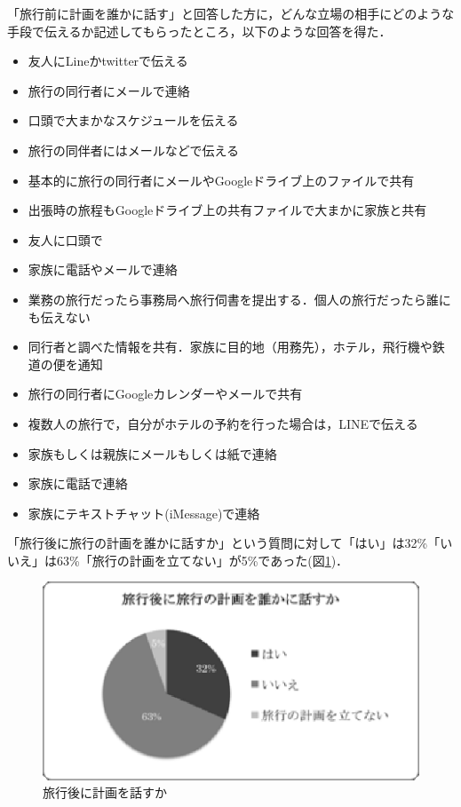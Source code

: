 \documentclass{funthesis}
\begin{document}
「旅行前に計画を誰かに話す」と回答した方に，どんな立場の相手にどのような手段で伝えるか記述してもらったところ，以下のような回答を得た．
\begin{itemize}
 \item 友人にLineかtwitterで伝える
 \item 旅行の同行者にメールで連絡
 \item 口頭で大まかなスケジュールを伝える
 \item 旅行の同伴者にはメールなどで伝える
 \item 基本的に旅行の同行者にメールやGoogleドライブ上のファイルで共有
 \item 出張時の旅程もGoogleドライブ上の共有ファイルで大まかに家族と共有
 \item 友人に口頭で
 \item 家族に電話やメールで連絡
 \item 業務の旅行だったら事務局へ旅行伺書を提出する．個人の旅行だったら誰にも伝えない
 \item 同行者と調べた情報を共有．家族に目的地（用務先），ホテル，飛行機や鉄道の便を通知
 \item 旅行の同行者にGoogleカレンダーやメールで共有
 \item 複数人の旅行で，自分がホテルの予約を行った場合は，LINEで伝える
 \item 家族もしくは親族にメールもしくは紙で連絡
 \item 家族に電話で連絡
 \item 家族にテキストチャット(iMessage)で連絡
\end{itemize}

\clearpage

「旅行後に旅行の計画を誰かに話すか」という質問に対して「はい」は32\%「いいえ」は63\%「旅行の計画を立てない」が5\%であった(図\ref{Laftertalktrip})．

\begin{figure}[htpb]
\begin{center}
\includegraphics[scale=0.65]{aftertalktrip.eps}
\end{center}
\caption{旅行後に計画を話すか}
\label{Laftertalktrip}
\end{figure}
\end{document}
